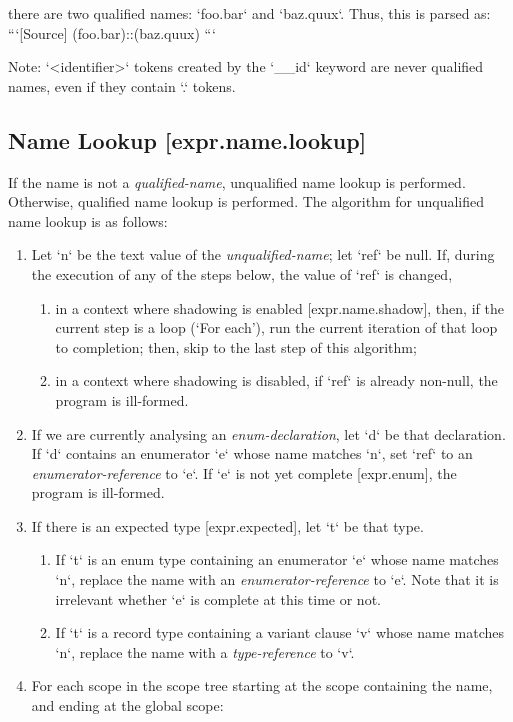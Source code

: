 \documentclass[a4paper, 12pt, oneside, final]{article}
\def\sref[#1]{[#1]}
\begin{document}
there are two qualified names: `foo.bar` and `baz.quux`. Thus, this is parsed as:
```[Source]
(foo.bar)::(baz.quux)
```

Note: `<identifier>` tokens created by the `__id` keyword are never qualified names, even if they contain `.` tokens.

\subsection{Name Lookup [expr.name.lookup]}
If the name is not a \emph{qualified-name}, unqualified name lookup is performed. Otherwise, qualified name lookup is performed.
The algorithm for unqualified name lookup is as follows:
\begin{enumerate}
\item Let `n` be the text value of the \emph{unqualified-name}; let `ref` be null. If, during the execution of any of the
      steps below, the value of `ref` is changed,
    \begin{enumerate}
        \item in a context where shadowing is enabled [expr.name.shadow], then, if the current step is a loop (‘For each’), run
              the current iteration of that loop to completion; then, skip to the last step of this algorithm;
        \item in a context where shadowing is disabled, if `ref` is already non-null, the program is ill-formed.
    \end{enumerate}
\item If we are currently analysing an \emph{enum-declaration}, let `d` be that declaration. If `d` contains an
      enumerator `e` whose name matches `n`, set `ref` to an \emph{enumerator-reference} to `e`. If `e` is not
      yet complete \sref[expr.enum], the program is ill-formed.
\item If there is an expected type \sref[expr.expected], let `t` be that type.
    \begin{enumerate}
        \item If `t` is an enum type containing an enumerator `e` whose name matches `n`, replace the name with an
              \emph{enumerator-reference} to `e`. Note that it is irrelevant whether `e` is complete at this time or not.
        \item If `t` is a record type containing a variant clause `v` whose name matches `n`, replace the name with a
              \emph{type-reference} to `v`.
      \end{enumerate}
\item For each scope in the scope tree starting at the scope containing the name, and ending at the global scope:

\end{enumerate}
\end{document}
